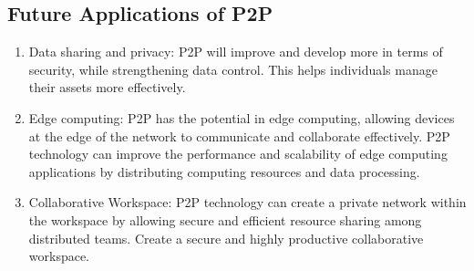 \subsection{Future Applications of P2P}

\begin{enumerate}
    \item Data sharing and privacy: P2P will improve and develop more in terms of security, while strengthening data control. This helps individuals manage their assets more effectively.
    
    \item Edge computing: P2P has the potential in edge computing, allowing devices at the edge of the network to communicate and collaborate effectively. P2P technology can improve the performance and scalability of edge computing applications by distributing computing resources and data processing.
    
    \item Collaborative Workspace: P2P technology can create a private network within the workspace by allowing secure and efficient resource sharing among distributed teams. Create a secure and highly productive collaborative workspace.
\end{enumerate}
